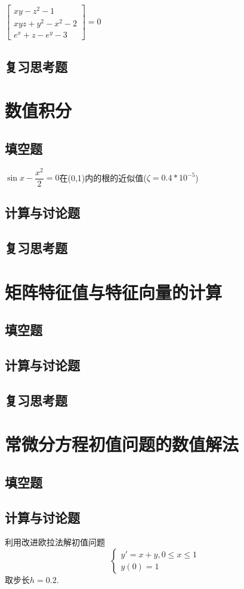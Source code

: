 \documentclass[lang=cn,newtx,12pt,scheme=chinese]{elegantbook}
\begin{document}
$\begin{bmatrix}
	xy-z^2-1\\
	xyz+y^2-x^2-2\\
	e^x+z-e^y-3
\end{bmatrix}=0$
\section{复习思考题}
\chapter{数值积分}
\section{填空题}
$\sin x-\dfrac{x^2}{2}=0$在(0,1)内的根的近似值($\zeta=0.4*10^{-5}$)
\section{计算与讨论题}
\section{复习思考题}
\chapter{矩阵特征值与特征向量的计算}
\section{填空题}
\section{计算与讨论题}
\section{复习思考题}
\chapter{常微分方程初值问题的数值解法}
\section{填空题}
\section{计算与讨论题}
\begin{exercise}
	利用改进欧拉法解初值问题\[ 
	\begin{cases}
		y'=x+y,0\leq x\leq 1\\
		y(0)=1
	\end{cases}
	 \]
	 取步长$h=0.2$.
\end{exercise}
\end{document}
